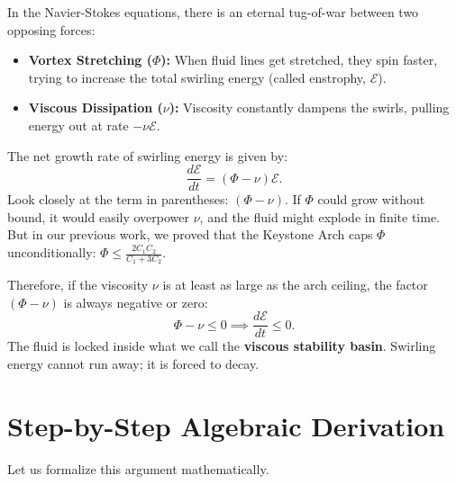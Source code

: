 \documentclass[11pt,a4paper]{article}
\theoremstyle{definition}
\begin{document}
In the Navier-Stokes equations, there is an eternal tug-of-war between two opposing forces:
\begin{itemize}
    \item \textbf{Vortex Stretching ($\Phi$):} When fluid lines get stretched, they spin faster, trying to increase the total swirling energy (called enstrophy, $\mathcal{E}$).
    \item \textbf{Viscous Dissipation ($\nu$):} Viscosity constantly dampens the swirls, pulling energy out at rate $-\nu \mathcal{E}$.
\end{itemize}
The net growth rate of swirling energy is given by:
\begin{equation}
\frac{d\mathcal{E}}{dt} = (\Phi - \nu)\mathcal{E}.
\end{equation}
Look closely at the term in parentheses: $(\Phi - \nu)$.
If $\Phi$ could grow without bound, it would easily overpower $\nu$, and the fluid might explode in finite time. But in our previous work, we proved that the Keystone Arch caps $\Phi$ unconditionally: $\Phi \le \frac{2C_1 C_2}{C_1 + 3C_2}$.

Therefore, if the viscosity $\nu$ is at least as large as the arch ceiling, the factor $(\Phi - \nu)$ is always negative or zero:
\begin{equation}
\Phi - \nu \le 0 \implies \frac{d\mathcal{E}}{dt} \le 0.
\end{equation}
The fluid is locked inside what we call the \textbf{viscous stability basin}. Swirling energy cannot run away; it is forced to decay.


\section{Step-by-Step Algebraic Derivation}

Let us formalize this argument mathematically.
\end{document}
